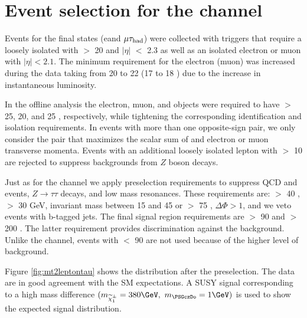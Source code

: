 \section{\texorpdfstring{Event selection for the \leptonTau channel}{Event selection for the lepton-tau channel}}
\label{sect:eleTauCuts}
Events for the \leptonTau final states (e\Tau and $\mu\tau_{\rm had}$)
were collected with triggers that require 
a loosely isolated \Tau with \PT $>$ 20 \GeV and $|\eta|$ $<$ 2.3 as well as
an isolated electron or muon with $|\eta| < 2.1$.  The minimum
\PT requirement for the electron (muon) was increased during the data taking from 20 to 22 \GeV (17 to 18 \GeV)
due to the increase in instantaneous luminosity.

In the offline analysis the electron, muon, and \Tau objects were required to have \PT $>$ 25, 20, and 25 \GeV, respectively, 
while tightening the corresponding identification and isolation requirements.
In events with more than one opposite-sign \leptonTau pair, we only consider
 the pair that maximizes the scalar sum of \Tau and electron or muon 
transverse momenta.  Events with an additional loosely isolated lepton
with \PT $>$ 10 \GeV are rejected to suppress backgrounds from $Z$ boson
decays.  

Just as for the \Tau\Tau channel we apply preselection requirements to suppress
QCD and \ttbar events, $Z \to \tau \tau$ decays, and low mass resonances.
These requirements are: \mttwo $>$ 40 \GeV, \MPT $>$ 30 GeV, \leptonTau 
invariant mass between 15 and 45 \GeV or $>$ 75 \GeV, $\Delta \Phi > 1$, and we veto events with b-tagged jets.
The final signal region requirements are \mttwo $>$ 90 \GeV and 
\tauMT $>$ 200 \GeV. %
The latter requirement provides discrimination against the \wjets background.  Unlike the \tauTau channel,
events with \mttwo $<$ 90 \GeV are not used because of the higher 
level of background.


Figure \ref{fig:mt2leptontau} %
shows the \mttwo distribution after the preselection.
The data are in good agreement with the SM expectations. A SUSY signal corresponding to a high mass difference 
 $(m_{\chione}=380\GeV,~m_{\PSGczDo}=1\GeV)$ is used to show the expected signal distribution.

